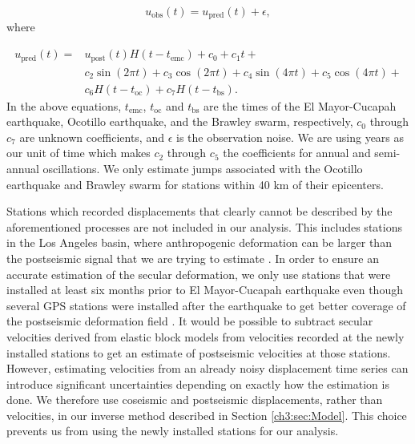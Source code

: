 \begin{equation}
  u_\mathrm{obs}(t) = u_\mathrm{pred}(t) + \epsilon,
\end{equation}
where

\begin{equation}\label{TimeSeriesModel}
  \begin{split}  
    u_\mathrm{pred}(t) = &u_\mathrm{post}(t)H(t-t_\mathrm{emc}) + c_0 + c_1t + \\
                         &c_2\sin(2\pi t) + c_3\cos(2\pi t) + c_4\sin(4\pi t) + c_5\cos(4\pi t) + \\
                         &c_6H(t-t_\mathrm{oc}) + c_7H(t-t_\mathrm{bs}).
  \end{split}
\end{equation}
In the above equations, $t_\mathrm{emc}$, $t_\mathrm{oc}$ and $t_\mathrm{bs}$ are the times of the El Mayor-Cucapah earthquake, Ocotillo earthquake, and the Brawley swarm, respectively, $c_0$ through $c_7$ are unknown coefficients, and $\epsilon$ is the observation noise.  We are using years as our unit of time which makes $c_2$ through $c_5$ the coefficients for annual and semi-annual oscillations.  We only estimate jumps associated with the Ocotillo earthquake and Brawley swarm for stations within 40 km of their epicenters. 

Stations which recorded displacements that clearly cannot be described by the aforementioned processes are not included in our analysis. This includes stations in the Los Angeles basin, where anthropogenic deformation can be larger than the postseismic signal that we are trying to estimate \citep{Bawden2001,Argus2005}. In order to ensure an accurate estimation of the secular deformation, we only use stations that were installed at least six months prior to El Mayor-Cucapah earthquake even though several GPS stations were installed after the earthquake to get better coverage of the postseismic deformation field \citep{Spinler2015}.  It would be possible to subtract secular velocities derived from elastic block models \citep[e.g.][]{Meade2005} from velocities recorded at the newly installed stations to get an estimate of postseismic velocities at those stations. However, estimating velocities from an already noisy displacement time series can introduce significant uncertainties depending on exactly how the estimation is done.  We therefore use coseismic and postseismic displacements, rather than velocities, in our inverse method described in Section \ref{ch3:sec:Model}. This choice prevents us from using the newly installed stations for our analysis.   

